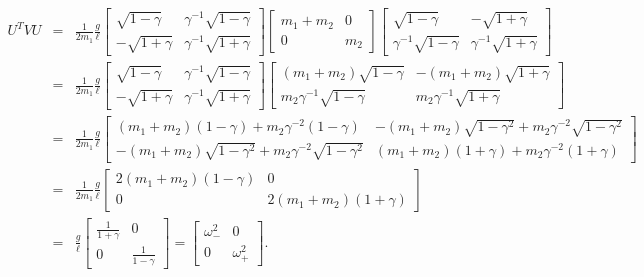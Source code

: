 \documentclass[letterpaper,11pt]{article}
\begin{document}
\begin{eqnarray*}
 U^T V U & = & \frac{1}{2 m_1} \frac{g}{\ell}
         \left[ \begin{array}{cc}
          \sqrt{1 - \gamma} & \gamma^{-1} \sqrt{1 - \gamma} \\
          - \sqrt{1 + \gamma} & \gamma^{-1} \sqrt{1 + \gamma}
         \end{array} \right]
         \left[ \begin{array}{cc}
          m_1 + m_2 & 0 \\
          0 & m_2 
         \end{array} \right]
         \left[ \begin{array}{cc}
          \sqrt{1 - \gamma} & - \sqrt{1 + \gamma} \\
          \gamma^{-1} \sqrt{1 - \gamma} & \gamma^{-1} \sqrt{1 + \gamma}
         \end{array} \right] \\
 & = & \frac{1}{2 m_1} \frac{g}{\ell}
         \left[ \begin{array}{cc}
          \sqrt{1 - \gamma} & \gamma^{-1} \sqrt{1 - \gamma} \\
          - \sqrt{1 + \gamma} & \gamma^{-1} \sqrt{1 + \gamma}
         \end{array} \right]
         \left[ \begin{array}{cc}
          (m_1 + m_2) \sqrt{1 - \gamma} & - (m_1 + m_2) \sqrt{1 + \gamma} \\
          m_2 \gamma^{-1} \sqrt{1 - \gamma} & m_2 \gamma^{-1} \sqrt{1 + \gamma}
         \end{array} \right] \\
 & = & \frac{1}{2 m_1} \frac{g}{\ell}
         \left[ \begin{array}{cc}
          (m_1 + m_2) (1 - \gamma) + m_2 \gamma^{-2} (1 - \gamma) & - (m_1 + m_2) \sqrt{1 - \gamma^2} + m_2 \gamma^{-2} \sqrt{1 - \gamma^2} \\
          - (m_1 + m_2) \sqrt{1 - \gamma^2} + m_2 \gamma^{-2} \sqrt{1 - \gamma^2} & (m_1 + m_2) (1 + \gamma) + m_2 \gamma^{-2} (1 + \gamma)
         \end{array} \right] \\
 & = & \frac{1}{2 m_1} \frac{g}{\ell}
         \left[ \begin{array}{cc}
          2 (m_1 + m_2) (1 - \gamma) & 0 \\
          0 & 2 (m_1 + m_2) (1 + \gamma)
         \end{array} \right] \\
 & = & \frac{g}{\ell}
         \left[ \begin{array}{cc}
          \frac{1}{1 + \gamma} & 0 \\
          0 & \frac{1}{1 - \gamma}
         \end{array} \right] = 
         \left[ \begin{array}{cc}
          \omega_-^2 & 0 \\
          0 & \omega_+^2
         \end{array} \right].
\end{eqnarray*}
\end{document}
